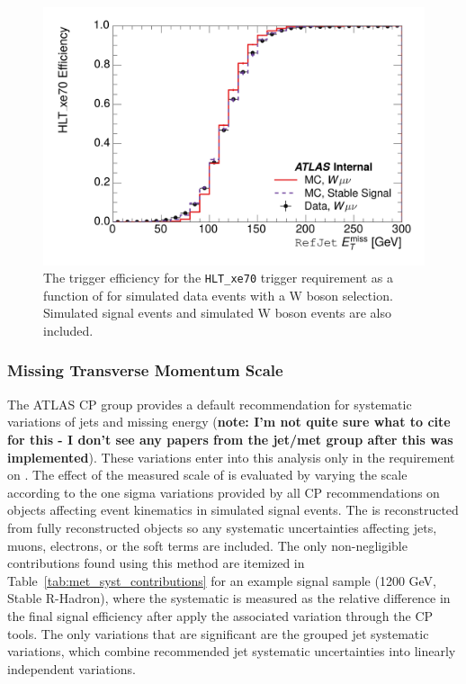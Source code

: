 \begin{figure}[h]
\centering
\includegraphics[width=\halffig]{figures/hlt_xe70_calomet.png}
\caption{The trigger efficiency for the \texttt{HLT\_xe70} trigger requirement as a function of \calomet for simulated data events with a W boson selection. Simulated signal events and simulated W boson events are also included.}
\label{fig:trigger_turnon_calo}
\end{figure}

\subsubsection{Missing Transverse Momentum Scale}

The \ac{ATLAS} \ac{CP} group provides a default recommendation for systematic variations of jets and missing energy (\textbf{note: I'm not quite sure what to cite for this - I don't see any papers from the jet/met group after this was implemented}). These variations enter into this analysis only in the requirement on \met. The effect of the measured scale of \met is evaluated by varying the \met scale according to the one sigma variations provided by all \ac{CP} recommendations on objects affecting event kinematics in simulated signal events. The \met is reconstructed from fully reconstructed objects so any systematic uncertainties affecting jets, muons, electrons, or the \met soft terms are included. The only non-negligible contributions found using this method are itemized in Table~\ref{tab:met_syst_contributions} for an example signal sample (1200 GeV, Stable R-Hadron), where the systematic is measured as the relative difference in the final signal efficiency after apply the associated variation through the CP tools. The only variations that are significant are the grouped jet systematic variations, which combine recommended jet systematic uncertainties into linearly independent variations. 


